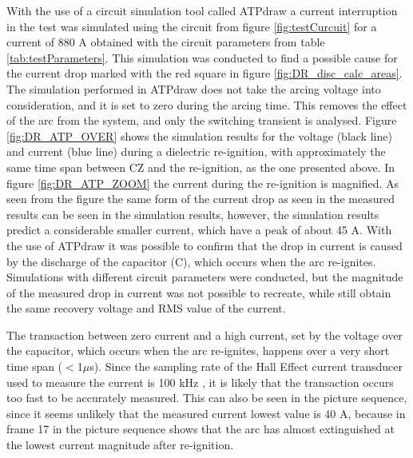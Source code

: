 \documentclass[10pt,b5paper,twoside]{article}
\begin{document}

With the use of a circuit simulation tool called ATPdraw a current interruption in the test was simulated using the circuit from figure \ref{fig:testCurcuit} for a current of 880 A obtained with the circuit parameters from table \ref{tab:testParameters}. This simulation was conducted to find a possible cause for the current drop marked with the red square in figure \ref{fig:DR_disc_calc_areas}. The simulation performed in ATPdraw does not take the arcing voltage into consideration, and it is set to zero during the arcing time. This removes the effect of the arc from the system, and only the switching transient is analysed. Figure \ref{fig:DR_ATP_OVER} shows the simulation results for the voltage (black line) and current (blue line) during a dielectric re-ignition, with approximately the same time span between CZ and the re-ignition, as the one presented above. In figure \ref{fig:DR_ATP_ZOOM} the current during the re-ignition is magnified. As seen from the figure the same form of the current drop as seen in the measured results can be seen in the simulation results, however, the simulation results predict a considerable smaller current, which have a peak of about 45 A. With the use of ATPdraw it was possible to confirm that the drop in current is caused by the discharge of the capacitor (C), which occurs when the arc re-ignites. Simulations with different circuit parameters were conducted, but the magnitude of the measured drop in current was not possible to recreate, while still obtain the same recovery voltage and RMS value of the current.

The transaction between zero current and a high current, set by the voltage over the capacitor, which occurs when the arc re-ignites, happens over a very short time span ($<$1$\mu$s). Since the sampling rate of the Hall Effect current transducer used to measure the current is 100 kHz \cite{bib:HallEffect}, it is likely that the transaction occurs too fast to be accurately measured. This can also be seen in the picture sequence, since it seems unlikely that the measured current lowest value is 40 A, because in frame 17 in the picture sequence shows that the arc has almost extinguished at the lowest current magnitude after re-ignition.
\end{document}
